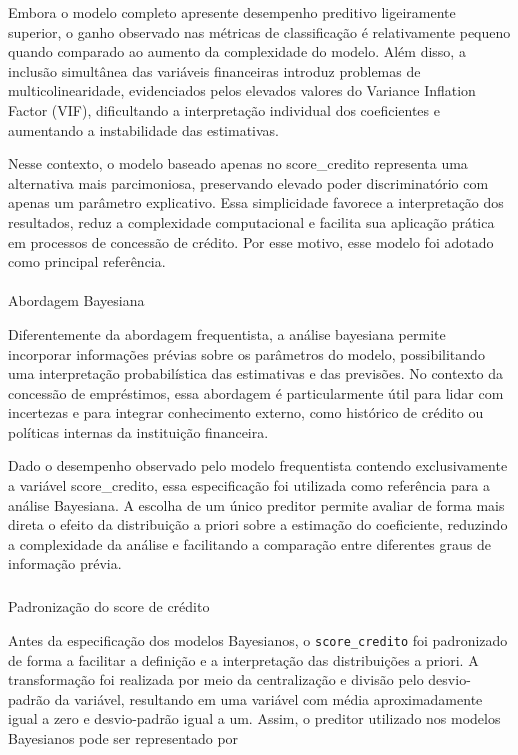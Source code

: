 \documentclass[
  brazilian,
  12pt,
  letterpaper,
  DIV=11,
  numbers=noendperiod]{scrartcl}
\makeatletter
\let\oldparagraph\paragraph
\renewcommand{\paragraph}{
    \@ifstar
      \xxxParagraphStar
      \xxxParagraphNoStar
  }
\newcommand{\xxxParagraphStar}[1]{\oldparagraph*{#1}\mbox{}}
\newcommand{\xxxParagraphNoStar}[1]{\oldparagraph{#1}\mbox{}}
\let\oldsubparagraph\subparagraph
\renewcommand{\subparagraph}{
    \@ifstar
      \xxxSubParagraphStar
      \xxxSubParagraphNoStar
  }
\newcommand{\xxxSubParagraphStar}[1]{\oldsubparagraph*{#1}\mbox{}}
\newcommand{\xxxSubParagraphNoStar}[1]{\oldsubparagraph{#1}\mbox{}}
\makeatother
\begin{document}
Embora o modelo completo apresente desempenho preditivo ligeiramente
superior, o ganho observado nas métricas de classificação é
relativamente pequeno quando comparado ao aumento da complexidade do
modelo. Além disso, a inclusão simultânea das variáveis financeiras
introduz problemas de multicolinearidade, evidenciados pelos elevados
valores do Variance Inflation Factor (VIF), dificultando a interpretação
individual dos coeficientes e aumentando a instabilidade das
estimativas.

Nesse contexto, o modelo baseado apenas no score\_credito representa uma
alternativa mais parcimoniosa, preservando elevado poder discriminatório
com apenas um parâmetro explicativo. Essa simplicidade favorece a
interpretação dos resultados, reduz a complexidade computacional e
facilita sua aplicação prática em processos de concessão de crédito. Por
esse motivo, esse modelo foi adotado como principal referência.

\paragraph{Abordagem Bayesiana}\label{abordagem-bayesiana}

Diferentemente da abordagem frequentista, a análise bayesiana permite
incorporar informações prévias sobre os parâmetros do modelo,
possibilitando uma interpretação probabilística das estimativas e das
previsões. No contexto da concessão de empréstimos, essa abordagem é
particularmente útil para lidar com incertezas e para integrar
conhecimento externo, como histórico de crédito ou políticas internas da
instituição financeira.

Dado o desempenho observado pelo modelo frequentista contendo
exclusivamente a variável score\_credito, essa especificação foi
utilizada como referência para a análise Bayesiana. A escolha de um
único preditor permite avaliar de forma mais direta o efeito da
distribuição a priori sobre a estimação do coeficiente, reduzindo a
complexidade da análise e facilitando a comparação entre diferentes
graus de informação prévia.

\subparagraph{Padronização do score de
crédito}\label{padronizauxe7uxe3o-do-score-de-cruxe9dito}

Antes da especificação dos modelos Bayesianos, o \texttt{score\_credito}
foi padronizado de forma a facilitar a definição e a interpretação das
distribuições a priori. A transformação foi realizada por meio da
centralização e divisão pelo desvio-padrão da variável, resultando em
uma variável com média aproximadamente igual a zero e desvio-padrão
igual a um. Assim, o preditor utilizado nos modelos Bayesianos pode ser
representado por
\end{document}
